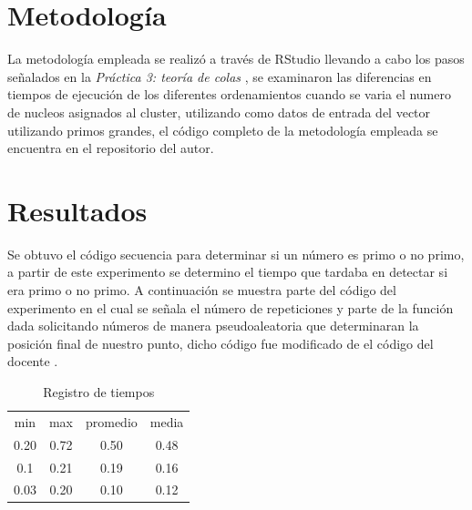 \documentclass[a4paper]{article}
\begin{document}
\section{Metodología}
\justify
La metodología empleada se realizó a través de RStudio\cite{RStudio} llevando a cabo los pasos señalados en la \textit{Práctica 3: teoría de colas} \cite{p3}, se examinaron las diferencias en tiempos de ejecución de los diferentes ordenamientos cuando se varia el numero de nucleos asignados al cluster, utilizando como datos de entrada del vector utilizando primos grandes, el código completo de la metodología empleada se encuentra en el repositorio \cite{gitadrian} del autor.


\section{Resultados}
\justify
Se obtuvo el código secuencia para determinar si un número es primo o no primo, a partir de este experimento se determino el tiempo que tardaba en detectar si era primo o no primo. A continuación se muestra parte del código del experimento \cite{gitadrian} en el cual se señala el número de repeticiones y parte de la función dada solicitando números de manera pseudoaleatoria que determinaran la posición final de nuestro punto, dicho código fue modificado de el código del docente \cite{p3gitdr}. 

 \begin{table}[h!]
     \centering
          \caption{Registro de tiempos}
     \begin{tabular}{c|c|c|c}
           min & max & promedio & media  \\
           0.20 & 0.72 & 0.50 & 0.48  \\
           0.1 & 0.21 & 0.19 & 0.16  \\
           0.03 & 0.20 & 0.10 & 0.12 \\
     \end{tabular}
     \label{tab:my_label}
 \end{table}
 
\end{document}
